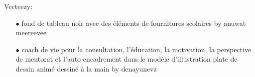\documentclass[8pt,xcolor=pdftex,table]{beamer}
\begin{document}
\begin{frame}[t]
{\begin{minipage}[t]{0.48\textwidth}
	\end{minipage}
	\begin{minipage}[t]{0.48\textwidth}
		Vecteezy:
		\begin{itemize}
			\item[$\bullet$] fond de tableau noir avec des éléments de fournitures scolaires by anuwat meereevee
			\item[$\bullet$] coach de vie pour la consultation, l'éducation, la motivation, la perspective de mentorat et l'auto-encadrement dans le modèle d'illustration plate de dessin animé dessiné à la main by denayunevz
		\end{itemize}
			
	\end{minipage}

	}%

\end{frame}


\end{document}
